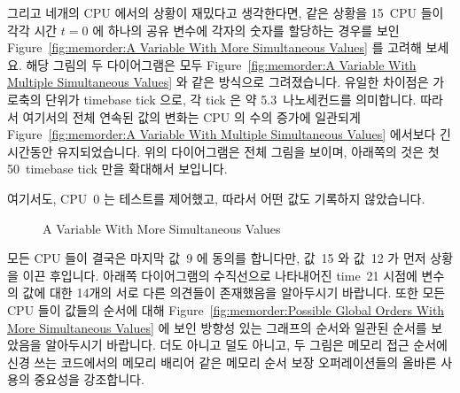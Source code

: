 그리고 네개의 CPU 에서의 상황이 재밌다고 생각한다면, 같은 상황을 15~CPU 들이
각각 시간 $t=0$ 에 하나의 공유 변수에 각자의 숫자를 할당하는 경우를 보인
Figure~\ref{fig:memorder:A Variable With More Simultaneous Values} 를 고려해
보세요.
해당 그림의 두 다이어그램은 모두
Figure~\ref{fig:memorder:A Variable With Multiple Simultaneous Values} 와 같은
방식으로 그려졌습니다.
유일한 차이점은 가로축의 단위가 timebase tick 으로, 각 tick 은 약
5.3~나노세컨드를 의미합니다.
따라서 여기서의 전체 연속된 값의 변화는 CPU 의 수의 증가에 일관되게
Figure~\ref{fig:memorder:A Variable With Multiple Simultaneous Values} 에서보다
긴 시간동안 유지되었습니다.
위의 다이어그램은 전체 그림을 보이며, 아래쪽의 것은 첫 50~timebase tick 만을
확대해서 보입니다.

여기서도, CPU~0 는 테스트를 제어했고, 따라서 어떤 값도 기록하지 않았습니다.

\begin{figure}
\centering
{}
\caption{A Variable With More Simultaneous Values}
\end{figure}

모든 CPU 들이 결국은 마지막 값~9 에 동의를 합니다만, 값~15 와 값~12 가 먼저
상황을 이끈 후입니다.
아래쪽 다이어그램의 수직선으로 나타내어진 time~21 시점에 변수의 값에 대한
14개의 서로 다른 의견들이 존재했음을 알아두시기 바랍니다.
또한 모든 CPU 들이 값들의 순서에 대해
Figure~\ref{fig:memorder:Possible Global Orders With More Simultaneous Values}
에 보인 방향성 있는 그래프의 순서와 일관된 순서를 보았음을 알아두시기 바랍니다.
더도 아니고 덜도 아니고, 두 그림은 메모리 접근 순서에 신경 쓰는 코드에서의
메모리 배리어 같은 메모리 순서 보장 오퍼레이션들의 올바른 사용의 중요성을
강조합니다.
\iffalse

